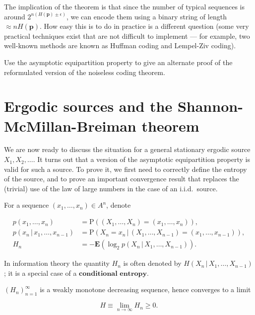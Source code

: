 \noindent The implication of the theorem is that since the
number of typical sequences is around
$2^{n(H(\mathbf{p})\pm \epsilon)}$, we can encode
them using a binary string of length
$\approx nH(\mathbf{p})$. How easy this is to do in
practice is a different question (some very practical
techniques exist that are not difficult to implement
--- for example, two well-known methods are known as
Huffman coding and Lempel-Ziv coding).

\begin{xexercise}
Use the asymptotic equipartition property to give an
alternate proof of the reformulated version of the
noiseless coding theorem.
\end{xexercise}

\section{Ergodic sources and the Shannon-McMillan-Breiman theorem}
We are now ready to discuss the situation for a
general stationary ergodic source $X_1,X_2,\ldots$.
It turns out that a version of the asymptotic
equipartition property is valid for such a source. To
prove it, we first need to correctly define the
entropy of the source, and to prove an important
convergence result that replaces the (trivial) use of
the law of large numbers in the case of an i.i.d.\
source.

For a sequence $(x_1,\ldots,x_n)\in A^n$, denote

\begin{align*}
p(x_1,\ldots,x_n) &= \tag{29}\label{eq:psymbols1} \mathrm{P}((X_1,\ldots,X_n)=(x_1,\ldots,x_n)), \\
p(x_n\,|\,x_1,\ldots,x_{n-1}) &= \tag{30}\label{eq:psymbols2} \mathrm{P}(X_n=x_n\,|\,(X_1,\ldots,X_{n-1})=(x_1,\ldots,x_{n-1})),
\\
H_n &= \tag{31}\label{eq:psymbols3} -\mathbf{E}(\log_2 p(X_n\,|\,X_1,\ldots,X_{n-1})).
\end{align*}

\noindent In information theory the quantity $H_n$ is often
denoted by $H(X_n\,|\, X_1,\ldots,X_{n-1})$; it is a
special case of a $\textbf{conditional entropy}$.

\begin{lem}
\label{lem-entropy-ergodic}
$(H_n)_{n=1}^\infty$ is a weakly monotone decreasing
sequence, hence converges to a limit

\begin{equation*} \tag{32}\label{eq:entropy-ergodic}
H \equiv \lim_{n\to\infty} H_n \ge 0.
\end{equation*}

\end{lem}

